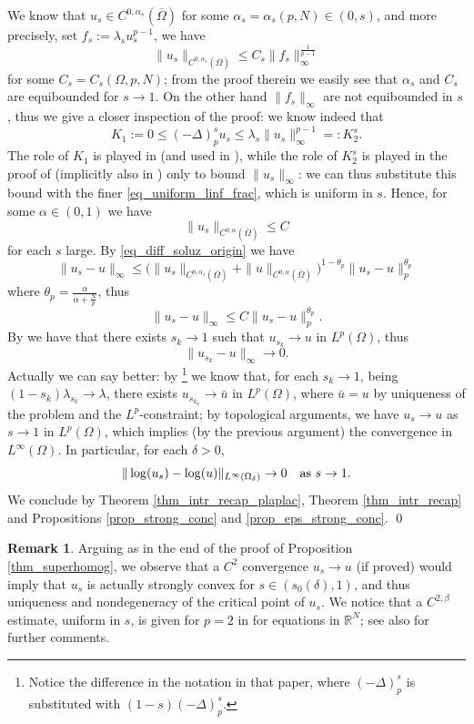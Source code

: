 \documentclass[11pt, reqno]{amsart}
\theoremstyle{definition}
\newtheorem{remark}[lemma]{Remark}
\numberwithin{equation}{section}
\newcommand{\R}{\mathbb{R}}
\def\norm#1{\|#1\|}
\renewenvironment{proof}[1][\proofname]{\medskip \noindent {\bfseries #1. }}{\qed \bigskip}
\begin{document}
\begin{proof}
We know \cite[Theorem 1.1]{IMS14} that $u_s \in C^{0,\alpha_s}(\overline{\Omega})$ for some $\alpha_s= \alpha_s(p,N) \in (0,s)$, and more precisely, set $f_s:= \lambda_s u_s^{p-1}$, we have
$$\norm{u_s}_{C^{0,\alpha_s}(\overline{\Omega})} \leq C_s \norm{f_s}_{\infty}^{\frac{1}{p-1}}$$
for some $C_s=C_s(\Omega, p, N)$; from the proof therein we easily see that $\alpha_s$ and $C_s$ are equibounded for $s \to 1$.
On the other hand $\norm{f_s}_{\infty}$ are not equibounded in $s$, thus we give a closer inspection of the proof: we know indeed that
$$K_1 := 0 \leq (-\Delta)^s_p u_s \leq \lambda_s \norm{u_s}_{\infty}^{p-1} =: K_2^s.$$
The role of $K_1$ is played in \cite[Theorem 5.2 and Lemma 5.3]{IMS14} (and used in \cite[Theorem 5.4]{IMS14}), while the role of $K_2^s$ is played in the proof of \cite[Theorem 1.1]{IMS14} (implicitly also in \cite[Theorem 5.4 and Corollary 5.5]{IMS14}) only to bound $\norm{u_s}_{\infty}$: we can thus substitute this bound with the finer \eqref{eq_uniform_linf_frac}, which is uniform in $s$.
Hence, for some $\alpha \in (0,1)$ we have
$$\norm{u_s}_{C^{0,\alpha}(\overline{\Omega})} \leq C$$
for each $s$ large.
By \eqref{eq_diff_soluz_origin} we have
$$\norm{u_s - u}_{\infty} \leq \big( \norm{u_s}_{C^{0,\alpha_s}(\overline{\Omega})} + \norm{u}_{C^{0,\alpha}(\overline{\Omega})}\big)^{1-\theta_p} \norm{u_s - u}_p^{\theta_p}$$
where $\theta_p = \frac{\alpha}{\alpha + \frac{N}{p}}$,
thus
$$\norm{u_s - u}_{\infty} \leq C \norm{u_s - u}_p^{\theta_p}.$$
By \cite[Theorem 1.2]{BPS16} we have that there exists $s_k \to 1$ such that $u_{s_k} \to u$ in $L^p(\Omega)$, thus
$$\norm{u_{s_k} - u}_{\infty} \to 0.$$
Actually we can say better: by \cite[Theorem 5.1]{BoSa20}%
\footnote{Notice the difference in the notation in that paper, where $(-\Delta)^s_p$ is substituted with $(1-s) (-\Delta)^s_p$.} we know that, for each $s_k \to 1$, being $(1-s_k)\lambda_{s_k} \to \lambda$, there exists $u_{s_{k_n}} \to \bar{u}$ in $L^p(\Omega)$, where $\bar{u}=u$ by uniqueness of the problem and the $L^p$-constraint; by topological arguments, we have $u_s \to u$ as $s \to 1$ in $L^p(\Omega)$, which implies (by the previous argument) the convergence in $L^{\infty}(\Omega)$.
In particular, for each $\delta>0$, 
$$\norm{\log(u_{s}) - \log(u)}_{L^{\infty}(\Omega_{\delta})} \to 0 \quad \hbox{as $s \to 1$}.$$
We conclude by Theorem \ref{thm_intr_recap_plaplac}, Theorem \ref{thm_intr_recap} and Propositions \ref{prop_strong_conc} and \ref{prop_eps_strong_conc}.
\end{proof}

\begin{remark}
Arguing as in the end of the proof of Proposition \ref{thm_superhomog}, we observe that a $C^2$ convergence $u_s \to u$ (if proved) would imply that $u_s$ is actually strongly convex for $s \in (s_0(\delta), 1)$, and thus uniqueness and nondegeneracy of the critical point of $u_s$. We notice that a $C^{2,\beta}$ estimate, uniform in $s$, is given for $p=2$ in \cite[Lemma 4.4]{CaSi14} for equations in $\R^N$; see also \cite[Remark 4.1]{BPS16} for further comments.
\end{remark}
\end{document}
